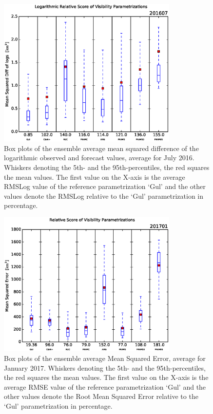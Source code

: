         \begin{figure}[p]
        \centering
            \includegraphics[width=0.8\textwidth]{graphics/results/EnsAv_logRMSE_box-201607.eps}
            \caption[Box Plots of Mean Squared Difference of Logs, July 2016]{Box plots of the ensemble average mean squared difference of the logarithmic observed and forecast values, average for July 2016. Whiskers denoting the 5th- and the 95th-percentiles, the red squares the mean values. The first value on the X-axis is the average RMSLog value of the reference parametrization `Gul' and the other values denote the RMSLog relative to the `Gul' parametrization in percentage.}
            \label{fig:July_logRMSE}
        \end{figure}
\begin{figure}[p]
    \centering
    \includegraphics[width=0.8\textwidth]{graphics/results/EnsAv_RMSE_box-201701.eps}
    \caption[Box Plots of MSE, January 2017]{Box plots of the ensemble average Mean Squared Error, average for January 2017. Whiskers denoting the 5th- and the 95th-percentiles, the red squares the mean values. The first value on the X-axis is the average RMSE value of the reference parametrization `Gul' and the other values denote the  Root Mean Squared Error relative to the `Gul' parametrization in percentage.}
    \label{fig:January_RMSE}
\end{figure}
